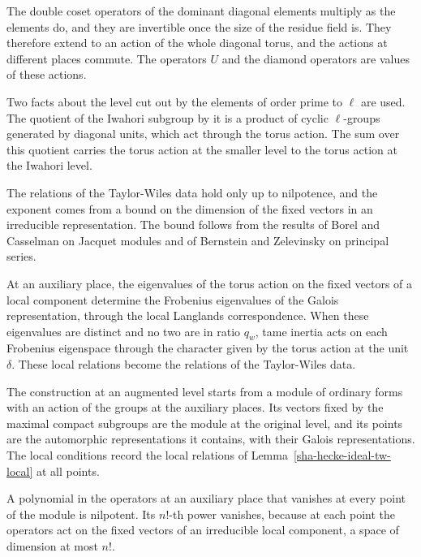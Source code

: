 The double coset operators of the dominant diagonal elements multiply as the elements do, and they are invertible once the size of the residue field is. They therefore extend to an action of the whole diagonal torus, and the actions at different places commute. The operators $U$ and the diamond operators are values of these actions.

Two facts about the level cut out by the elements of order prime to $\ell$ are used. The quotient of the Iwahori subgroup by it is a product of cyclic $\ell$-groups generated by diagonal units, which act through the torus action. The sum over this quotient carries the torus action at the smaller level to the torus action at the Iwahori level.

The relations of the Taylor-Wiles data hold only up to nilpotence, and the exponent comes from a bound on the dimension of the fixed vectors in an irreducible representation. The bound follows from the results of Borel and Casselman on Jacquet modules and of Bernstein and Zelevinsky on principal series.

At an auxiliary place, the eigenvalues of the torus action on the fixed vectors of a local component determine the Frobenius eigenvalues of the Galois representation, through the local Langlands correspondence. When these eigenvalues are distinct and no two are in ratio $q_w$, tame inertia acts on each Frobenius eigenspace through the character given by the torus action at the unit $\delta$. These local relations become the relations of the Taylor-Wiles data.

The construction at an augmented level starts from a module of ordinary forms with an action of the groups at the auxiliary places. Its vectors fixed by the maximal compact subgroups are the module at the original level, and its points are the automorphic representations it contains, with their Galois representations. The local conditions record the local relations of Lemma~\ref{sha-hecke-ideal-tw-local} at all points.

A polynomial in the operators at an auxiliary place that vanishes at every point of the module is nilpotent. Its $n!$-th power vanishes, because at each point the operators act on the fixed vectors of an irreducible local component, a space of dimension at most $n!$.

